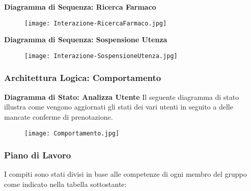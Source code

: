 \textbf{Diagramma di Sequenza: Ricerca Farmaco}

\begin{figure}[h!]
    \begin{center}
        \texttt{[image: Interazione-RicercaFarmaco.jpg]}
    \end{center}
\end{figure}
\hfill \break

\textbf{Diagramma di Sequenza: Sospensione Utenza}

\begin{figure}[h!]
    \begin{center}
        \texttt{[image: Interazione-SospensioneUtenza.jpg]}
    \end{center}
\end{figure}
\hfill \break

\newpage
\subsubsection{Architettura Logica: Comportamento}
\hfill \break

\textbf{Diagramma di Stato: Analizza Utente}
\hfill \break
Il seguente diagramma di stato illustra come vengono aggiornati gli stati dei
vari utenti in seguito a delle mancate conferme di prenotazione.

\begin{figure}[h!]
    \begin{center}
        \texttt{[image: Comportamento.jpg]}
    \end{center}
\end{figure}
\hfill \break

\newpage
\subsubsection{Piano di Lavoro}

I compiti sono stati divisi in base alle competenze di
ogni membro del gruppo come indicato nella tabella sottostante:
\hfill \break

